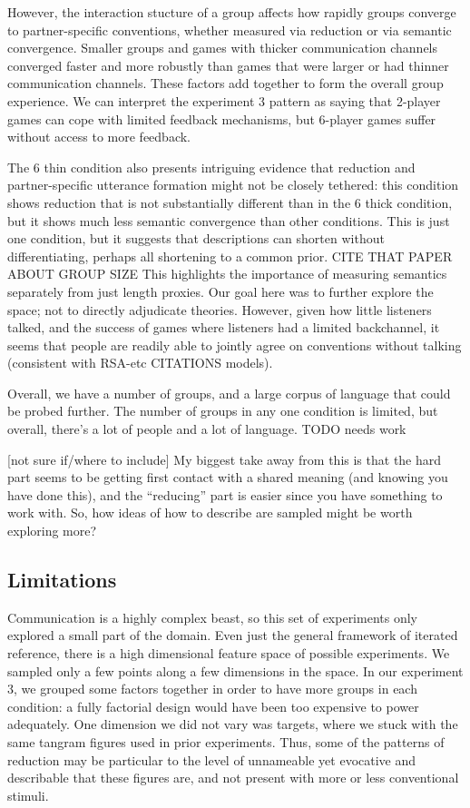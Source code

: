 \documentclass[
  english,
  a4paper,
]{article}
\begin{document}
However, the interaction stucture of a group affects how rapidly groups converge to partner-specific conventions, whether measured via reduction or via semantic convergence. Smaller groups and games with thicker communication channels converged faster and more robustly than games that were larger or had thinner communication channels. These factors add together to form the overall group experience. We can interpret the experiment 3 pattern as saying that 2-player games can cope with limited feedback mechanisms, but 6-player games suffer without access to more feedback.

The 6 thin condition also presents intriguing evidence that reduction and partner-specific utterance formation might not be closely tethered: this condition shows reduction that is not substantially different than in the 6 thick condition, but it shows much less semantic convergence than other conditions. This is just one condition, but it suggests that descriptions can shorten without differentiating, perhaps all shortening to a common prior. CITE THAT PAPER ABOUT GROUP SIZE This highlights the importance of measuring semantics separately from just length proxies.
Our goal here was to further explore the space; not to directly adjudicate theories. However, given how little listeners talked, and the success of games where listeners had a limited backchannel, it seems that people are readily able to jointly agree on conventions without talking (consistent with RSA-etc CITATIONS models).

Overall, we have a number of groups, and a large corpus of language that could be probed further. The number of groups in any one condition is limited, but overall, there's a lot of people and a lot of language. TODO needs work

{[}not sure if/where to include{]} My biggest take away from this is that the hard part seems to be getting first contact with a shared meaning (and knowing you have done this), and the ``reducing'' part is easier since you have something to work with. So, how ideas of how to describe are sampled might be worth exploring more?

\hypertarget{limitations}{%
\subsection{Limitations}\label{limitations}}

Communication is a highly complex beast, so this set of experiments only explored a small part of the domain. Even just the general framework of iterated reference, there is a high dimensional feature space of possible experiments. We sampled only a few points along a few dimensions in the space. In our experiment 3, we grouped some factors together in order to have more groups in each condition: a fully factorial design would have been too expensive to power adequately. One dimension we did not vary was targets, where we stuck with the same tangram figures used in prior experiments. Thus, some of the patterns of reduction may be particular to the level of unnameable yet evocative and describable that these figures are, and not present with more or less conventional stimuli.
\end{document}
